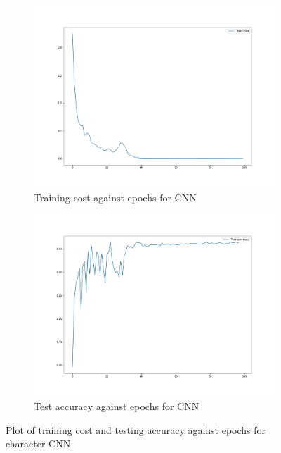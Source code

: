 \begin{figure}[H]
    \begin{subfigure}{0.5\textwidth}
        \centering
        \includegraphics[width=1\linewidth]{assets/plots2/q1_1.png}
        \caption{Training cost against epochs for CNN}
    \end{subfigure}
    \begin{subfigure}{0.5\textwidth}
        \centering
        \includegraphics[width=1\linewidth]{assets/plots2/q1_2.png}
        \caption{Test accuracy against epochs for CNN}
    \end{subfigure}
    \caption{Plot of training cost and testing accuracy against epochs for character CNN}
    \label{fig:2_1}
\end{figure}

